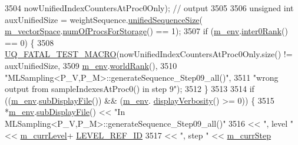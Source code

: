 \begin{DoxyCode}
3504                               nowUnifiedIndexCountersAtProc0Only); \textcolor{comment}{// output}
3505 
3506           \textcolor{keywordtype}{unsigned} \textcolor{keywordtype}{int} auxUnifiedSize = weightSequence.\hyperlink{class_q_u_e_s_o_1_1_scalar_sequence_a52829afc95e5c36e9db44f40854153b0}{unifiedSequenceSize}(
      \hyperlink{class_q_u_e_s_o_1_1_m_l_sampling_a7bc4c72f65ba9166ed94a6e198b0915b}{m\_vectorSpace}.\hyperlink{class_q_u_e_s_o_1_1_vector_space_a67b0c3620662116f5a346fdaa5faf38e}{numOfProcsForStorage}() == 1);
3507           \textcolor{keywordflow}{if} (\hyperlink{class_q_u_e_s_o_1_1_m_l_sampling_a13f1ca4fe9f94822fe572a743eaced1d}{m\_env}.\hyperlink{class_q_u_e_s_o_1_1_base_environment_ae106b5bb8a80b655b88b3a26b1e7c185}{inter0Rank}() == 0) \{
3508             \hyperlink{_defines_8h_a56d63d18d0a6d45757de47fcc06f574d}{UQ\_FATAL\_TEST\_MACRO}(nowUnifiedIndexCountersAtProc0Only.size() != 
      auxUnifiedSize,
3509                                 \hyperlink{class_q_u_e_s_o_1_1_m_l_sampling_a13f1ca4fe9f94822fe572a743eaced1d}{m\_env}.\hyperlink{class_q_u_e_s_o_1_1_base_environment_a78b57112bbd0e6dd0e8afec00b40ffa7}{worldRank}(),
3510                                 \textcolor{stringliteral}{"MLSampling<P\_V,P\_M>::generateSequence\_Step09\_all()"},
3511                                 \textcolor{stringliteral}{"wrong output from sampleIndexesAtProc0() in step 9"});
3512           \}
3513 
3514           \textcolor{keywordflow}{if} ((\hyperlink{class_q_u_e_s_o_1_1_m_l_sampling_a13f1ca4fe9f94822fe572a743eaced1d}{m\_env}.\hyperlink{class_q_u_e_s_o_1_1_base_environment_a8a0064746ae8dddfece4229b9ad374d6}{subDisplayFile}()) && (\hyperlink{class_q_u_e_s_o_1_1_m_l_sampling_a13f1ca4fe9f94822fe572a743eaced1d}{m\_env}.
      \hyperlink{class_q_u_e_s_o_1_1_base_environment_a1fe5f244fc0316a0ab3e37463f108b96}{displayVerbosity}() >= 0)) \{
3515             *\hyperlink{class_q_u_e_s_o_1_1_m_l_sampling_a13f1ca4fe9f94822fe572a743eaced1d}{m\_env}.\hyperlink{class_q_u_e_s_o_1_1_base_environment_a8a0064746ae8dddfece4229b9ad374d6}{subDisplayFile}() << \textcolor{stringliteral}{"In
       MLSampling<P\_V,P\_M>::generateSequence\_Step09\_all()"}
3516                                     << \textcolor{stringliteral}{", level "} << \hyperlink{class_q_u_e_s_o_1_1_m_l_sampling_af9416874c856e50f3b35270e801f17e4}{m\_currLevel}+
      \hyperlink{_m_l_sampling_level_options_8h_a68d15eaf394d210effcf584b938206d3}{LEVEL\_REF\_ID}
3517                                     << \textcolor{stringliteral}{", step "}  << \hyperlink{class_q_u_e_s_o_1_1_m_l_sampling_a1b1f8ccb4823bdfa26ec652f0807c63e}{m\_currStep}

\end{DoxyCode}
